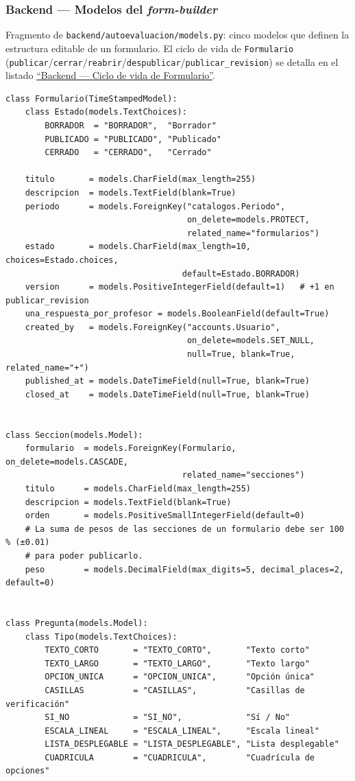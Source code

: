 \subsubsection{Backend --- Modelos del \emph{form-builder}}\label{lst:modelos_form_builder}

Fragmento de \texttt{backend/autoevaluacion/models.py}: cinco modelos que definen la estructura editable de un formulario. El ciclo de vida de \texttt{Formulario} (\texttt{publicar}/\texttt{cerrar}/\texttt{reabrir}/\texttt{despublicar}/\texttt{publicar\_revision}) se detalla en el listado \hyperref[lst:formulario_states]{``Backend --- Ciclo de vida de Formulario''}.

\begin{lstlisting}[language={[3]Python}]
class Formulario(TimeStampedModel):
    class Estado(models.TextChoices):
        BORRADOR  = "BORRADOR",  "Borrador"
        PUBLICADO = "PUBLICADO", "Publicado"
        CERRADO   = "CERRADO",   "Cerrado"

    titulo       = models.CharField(max_length=255)
    descripcion  = models.TextField(blank=True)
    periodo      = models.ForeignKey("catalogos.Periodo",
                                     on_delete=models.PROTECT,
                                     related_name="formularios")
    estado       = models.CharField(max_length=10, choices=Estado.choices,
                                    default=Estado.BORRADOR)
    version      = models.PositiveIntegerField(default=1)   # +1 en publicar_revision
    una_respuesta_por_profesor = models.BooleanField(default=True)
    created_by   = models.ForeignKey("accounts.Usuario",
                                     on_delete=models.SET_NULL,
                                     null=True, blank=True, related_name="+")
    published_at = models.DateTimeField(null=True, blank=True)
    closed_at    = models.DateTimeField(null=True, blank=True)


class Seccion(models.Model):
    formulario  = models.ForeignKey(Formulario, on_delete=models.CASCADE,
                                    related_name="secciones")
    titulo      = models.CharField(max_length=255)
    descripcion = models.TextField(blank=True)
    orden       = models.PositiveSmallIntegerField(default=0)
    # La suma de pesos de las secciones de un formulario debe ser 100 % (±0.01)
    # para poder publicarlo.
    peso        = models.DecimalField(max_digits=5, decimal_places=2, default=0)


class Pregunta(models.Model):
    class Tipo(models.TextChoices):
        TEXTO_CORTO       = "TEXTO_CORTO",       "Texto corto"
        TEXTO_LARGO       = "TEXTO_LARGO",       "Texto largo"
        OPCION_UNICA      = "OPCION_UNICA",      "Opción única"
        CASILLAS          = "CASILLAS",          "Casillas de verificación"
        SI_NO             = "SI_NO",             "Sí / No"
        ESCALA_LINEAL     = "ESCALA_LINEAL",     "Escala lineal"
        LISTA_DESPLEGABLE = "LISTA_DESPLEGABLE", "Lista desplegable"
        CUADRICULA        = "CUADRICULA",        "Cuadrícula de opciones"


\end{lstlisting}

